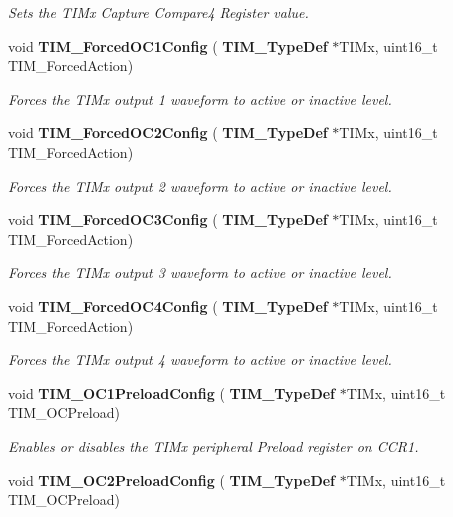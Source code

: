 \begin{DoxyCompactItemize}
\begin{DoxyCompactList}\small\item\em Sets the T\+I\+Mx Capture Compare4 Register value. \end{DoxyCompactList}\item 
void \textbf{ T\+I\+M\+\_\+\+Forced\+O\+C1\+Config} (\textbf{ T\+I\+M\+\_\+\+Type\+Def} $\ast$T\+I\+Mx, uint16\+\_\+t T\+I\+M\+\_\+\+Forced\+Action)
\begin{DoxyCompactList}\small\item\em Forces the T\+I\+Mx output 1 waveform to active or inactive level. \end{DoxyCompactList}\item 
void \textbf{ T\+I\+M\+\_\+\+Forced\+O\+C2\+Config} (\textbf{ T\+I\+M\+\_\+\+Type\+Def} $\ast$T\+I\+Mx, uint16\+\_\+t T\+I\+M\+\_\+\+Forced\+Action)
\begin{DoxyCompactList}\small\item\em Forces the T\+I\+Mx output 2 waveform to active or inactive level. \end{DoxyCompactList}\item 
void \textbf{ T\+I\+M\+\_\+\+Forced\+O\+C3\+Config} (\textbf{ T\+I\+M\+\_\+\+Type\+Def} $\ast$T\+I\+Mx, uint16\+\_\+t T\+I\+M\+\_\+\+Forced\+Action)
\begin{DoxyCompactList}\small\item\em Forces the T\+I\+Mx output 3 waveform to active or inactive level. \end{DoxyCompactList}\item 
void \textbf{ T\+I\+M\+\_\+\+Forced\+O\+C4\+Config} (\textbf{ T\+I\+M\+\_\+\+Type\+Def} $\ast$T\+I\+Mx, uint16\+\_\+t T\+I\+M\+\_\+\+Forced\+Action)
\begin{DoxyCompactList}\small\item\em Forces the T\+I\+Mx output 4 waveform to active or inactive level. \end{DoxyCompactList}\item 
void \textbf{ T\+I\+M\+\_\+\+O\+C1\+Preload\+Config} (\textbf{ T\+I\+M\+\_\+\+Type\+Def} $\ast$T\+I\+Mx, uint16\+\_\+t T\+I\+M\+\_\+\+O\+C\+Preload)
\begin{DoxyCompactList}\small\item\em Enables or disables the T\+I\+Mx peripheral Preload register on C\+C\+R1. \end{DoxyCompactList}\item 
void \textbf{ T\+I\+M\+\_\+\+O\+C2\+Preload\+Config} (\textbf{ T\+I\+M\+\_\+\+Type\+Def} $\ast$T\+I\+Mx, uint16\+\_\+t T\+I\+M\+\_\+\+O\+C\+Preload)

\end{DoxyCompactItemize}
